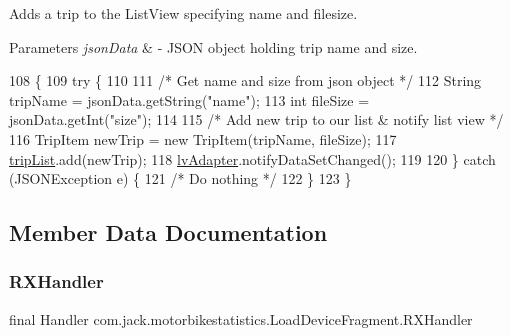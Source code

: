 Adds a trip to the List\+View specifying name and filesize. 


\begin{DoxyParams}{Parameters}
{\em json\+Data} & -\/ J\+S\+ON object holding trip name and size. \\
\hline
\end{DoxyParams}

\begin{DoxyCode}
108                                                     \{
109         \textcolor{keywordflow}{try} \{
110 
111             \textcolor{comment}{/* Get name and size from json object */}
112             String tripName = jsonData.getString(\textcolor{stringliteral}{"name"});
113             \textcolor{keywordtype}{int} fileSize = jsonData.getInt(\textcolor{stringliteral}{"size"});
114 
115             \textcolor{comment}{/* Add new trip to our list & notify list view */}
116             TripItem newTrip = \textcolor{keyword}{new} TripItem(tripName, fileSize);
117             \hyperlink{classcom_1_1jack_1_1motorbikestatistics_1_1_load_device_fragment_a92be11df86dfe159ecbdaff59e526464}{tripList}.add(newTrip);
118             \hyperlink{classcom_1_1jack_1_1motorbikestatistics_1_1_load_device_fragment_a3ccc43db37a3b6d9a7dc345e9ab78d6b}{lvAdapter}.notifyDataSetChanged();
119 
120         \} \textcolor{keywordflow}{catch} (JSONException e) \{
121             \textcolor{comment}{/* Do nothing */}
122         \}
123     \}
\end{DoxyCode}


\subsection{Member Data Documentation}
\mbox{\label{classcom_1_1jack_1_1motorbikestatistics_1_1_load_device_fragment_a7c26c8686c290d8766b051f31473d716}} 
\subsubsection{\texorpdfstring{R\+X\+Handler}{RXHandler}}
{\footnotesize\ttfamily final Handler com.\+jack.\+motorbikestatistics.\+Load\+Device\+Fragment.\+R\+X\+Handler}

